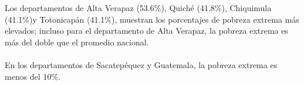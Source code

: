 Los departamentos de Alta Verapaz (53.6\%), Quiché (41.8\%), Chiquimula (41.1\%)y Totonicapán (41.1\%), muestran los porcentajes de pobreza extrema más elevados;  incluso para el departamento de Alta Verapaz, la pobreza extrema es más del doble que el promedio nacional.  \\\\ 
En los departamentos de Sacatepéquez y Guatemala, la pobreza extrema es menos del 10\%.
